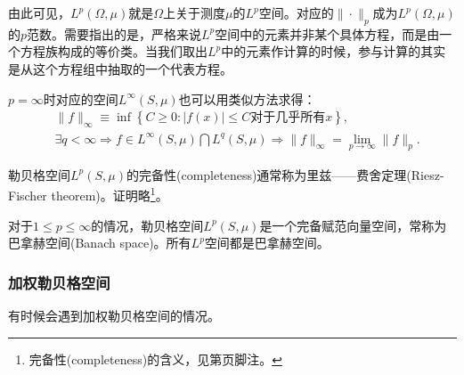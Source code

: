 由此可见，$L^p(\Omega,\mu)$就是$\Omega$上关于测度$\mu$的$L^p$空间。对应的$\| \cdot \|_p$成为$L^p(\Omega,\mu)$的$p$范数。需要指出的是，严格来说$L^p$空间中的元素并非某个具体方程，而是由一个方程族构成的等价类。当我们取出$L^p$中的元素作计算的时候，参与计算的其实是从这个方程组中抽取的一个代表方程。

$p = \infty$时对应的空间$L^{\infty}(S,\mu)$也可以用类似方法求得：
\begin{equation*}
  \begin{split}
    &\| f \|_{\infty} \equiv \inf \left\{ C \ge 0: \left| f(x) \right| \le C \text{对于几乎所有}x \right\},\\
    &\exists q < \infty \Rightarrow f \in L^{\infty}(S,\mu) \bigcap L^{q}(S,\mu) \Rightarrow \| f \|_{\infty} = \lim_{p \rightarrow \infty} \| f \|_{p}.
  \end{split}
\end{equation*}


勒贝格空间$L^{p}(S,\mu)$的完备性(completeness)通常称为里兹——费舍定理(Riesz-Fischer theorem)。证明略\footnote{完备性(completeness)的含义，见第\pageref{footnote:completeness-def}页脚注。}。

对于$1 \le p \le \infty$的情况，勒贝格空间$L^{p}(S,\mu)$是一个完备赋范向量空间，常称为巴拿赫空间(Banach space)。所有$L^{p}$空间都是巴拿赫空间。

\subsubsection{加权勒贝格空间}
\label{sec:lp-weightd-lp}
有时候会遇到加权勒贝格空间的情况。

